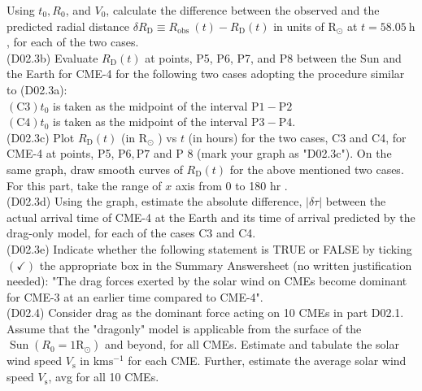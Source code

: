 \documentclass[10pt]{article}
\begin{document}
    Using $t_{0}, R_{0}$, and $V_{0}$, calculate the difference between the observed and the predicted radial distance $\delta R_{\mathrm{D}} \equiv R_{\text {obs }}(t)-R_{\mathrm{D}}(t)$ in units of $\mathrm{R}_{\odot}$ at $t=58.05 \mathrm{~h}$, for each of the two cases.\\
    (D02.3b) Evaluate $R_{\mathrm{D}}(t)$ at points, P5, P6, P7, and P8 between the Sun and the Earth for CME-4 for the following two cases adopting the procedure similar to (D02.3a):\\
    $(\mathrm{C} 3) t_{0}$ is taken as the midpoint of the interval $\mathrm{P} 1-\mathrm{P} 2$\\
    $(\mathrm{C} 4) t_{0}$ is taken as the midpoint of the interval $\mathrm{P} 3-\mathrm{P} 4$.\\
    (D02.3c) Plot $R_{\mathrm{D}}(t)$ (in $\mathrm{R}_{\odot}$ ) vs $t$ (in hours) for the two cases, C3 and C4, for CME-4 at points, P5, $\mathrm{P} 6, \mathrm{P} 7$ and P 8 (mark your graph as "D02.3c"). On the same graph, draw smooth curves of $R_{\mathrm{D}}(t)$ for the above mentioned two cases. For this part, take the range of $x$ axis from 0 to 180 hr .\\
    (D02.3d) Using the graph, estimate the absolute difference, $|\delta \tau|$ between the actual arrival time of CME-4 at the Earth and its time of arrival predicted by the drag-only model, for each of the cases C3 and C4.\\
    (D02.3e) Indicate whether the following statement is TRUE or FALSE by ticking $(\checkmark)$ the appropriate box in the Summary Answersheet (no written justification needed): "The drag forces exerted by the solar wind on CMEs become dominant for CME-3 at an earlier time compared to CME-4".\\
    (D02.4) Consider drag as the dominant force acting on 10 CMEs in part D02.1. Assume that the "dragonly" model is applicable from the surface of the $\operatorname{Sun}\left(R_{0}=1 \mathrm{R}_{\odot}\right)$ and beyond, for all CMEs. Estimate and tabulate the solar wind speed $V_{\mathrm{s}}$ in $\mathrm{km} \mathrm{s}^{-1}$ for each CME. Further, estimate the average solar wind speed $V_{\mathrm{s}}$, avg for all 10 CMEs.
\end{document}
